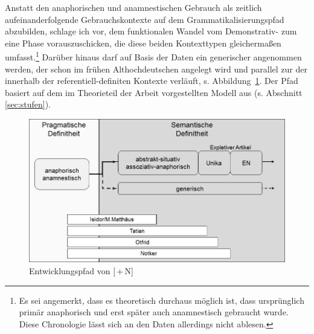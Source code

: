 Anstatt den anaphorischen  und anamnestischen  Gebrauch als zeitlich aufeinanderfolgende Gebrauchskontexte auf dem Grammatikalisierungspfad  abzubilden, schlage ich vor, dem funktionalen Wandel vom Demonstrativ-  zum  eine Phase vorauszuschicken, die diese beiden Kontexttypen gleichermaßen umfasst.\footnote{Es sei angemerkt, dass es theoretisch durchaus möglich ist, dass  ursprünglich primär anaphorisch  und erst später auch anamnestisch  gebraucht wurde. Diese Chronologie lässt sich an den Daten allerdings nicht ablesen.} Darüber hinaus darf auf Basis der Daten ein generischer   angenommen werden, der schon im frühen Althochdeutschen angelegt wird und parallel zur  der  innerhalb der referentiell-de\-fi\-ni\-ten Kontexte verläuft, s. Abbildung~\ref{abb:expansion-definitheit}. Der Pfad basiert auf dem im Theorieteil der Arbeit vorgestellten Modell aus \textcite{Schmuck2014} (s. Abschnitt \ref{sec:stufen}). 

 
\begin{figure}
  \includegraphics[width=.75\textwidth]{images/diskussion_generisch.png}
\caption {Entwicklungspfad von [\,+\,N]\label{abb:expansion-definitheit}} 
\end{figure} 
 
